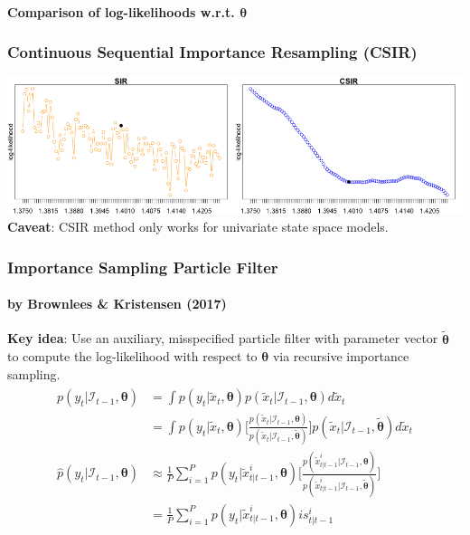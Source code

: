 \documentclass[11pt]{beamer}
\begin{document}
\begin{frame}
\framesubtitle{Comparison of log-likelihoods w.r.t. $\boldsymbol{\theta}$}
\frametitle{Continuous Sequential Importance Resampling (CSIR)}
\centering
\includegraphics[scale=0.30]{ullm-loglik-zoom-2}\\
\bigskip
\textbf{Caveat}: CSIR method only works for univariate state space models. 
\end{frame}

\begin{frame}
\frametitle{Importance Sampling Particle Filter}
\framesubtitle{by Brownlees \& Kristensen (2017)}
\textbf{Key idea}: Use an auxiliary, misspecified particle filter with parameter vector $\boldsymbol{\tilde{\theta}}$ to compute the log-likelihood with respect to $\boldsymbol{\theta}$ via recursive importance sampling.
\begin{align*} 
\begin{split}
p(y_t | \mathcal{I}_{t-1}, \boldsymbol{\theta}) &= \int p(y_t | \tilde{x}_t, \boldsymbol{\theta}) p(\tilde{x}_t | \mathcal{I}_{t-1}, \boldsymbol{\theta}) d \tilde{x}_t \\
&= \int p(y_t | \tilde{x}_t, \boldsymbol{\theta}) \bigg[ \frac{p(\tilde{x}_t | \mathcal{I}_{t-1}, \boldsymbol{\theta})}{p(\tilde{x}_t | \mathcal{I}_{t-1}, \boldsymbol{\tilde{\theta}})} \bigg] p(\tilde{x}_t | \mathcal{I}_{t-1}, \boldsymbol{\tilde{\theta}}) d \tilde{x}_t \\
\hat{p}(y_t | \mathcal{I}_{t-1}, \boldsymbol{\theta}) &\approx \frac{1}{P} \sum_{i=1}^P p(y_t | \tilde{x}_{t|t-1}^i, \boldsymbol{\theta})  \bigg[ \frac{p(\tilde{x}_{t|t-1}^i | \mathcal{I}_{t-1}, \boldsymbol{\theta})}{p(\tilde{x}_{t|t-1}^i | \mathcal{I}_{t-1}, \boldsymbol{\tilde{\theta}})} \bigg] \\
&= \frac{1}{P} \sum_{i=1}^P p(y_t | \tilde{x}_{t|t-1}^i, \boldsymbol{\theta}) is_{t|t-1}^i \\
\end{split}					
\end{align*}  
\end{frame}
\end{document}
